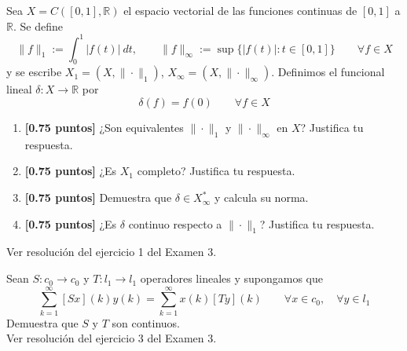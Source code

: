 \documentclass[12pt]{article}
\begin{document}
    \begin{ejercicio}[3 puntos]
        Sea $X = C([0,1],\mathbb{R})$ el espacio vectorial de las funciones continuas de $[0,1]$ a $\mathbb{R}$. Se define
        \begin{equation*}
            \|f\|_1 := \int_{0}^{1} |f(t)|~dt , \qquad \|f\|_\infty := \sup\{|f(t)| : t\in [0,1]\}\qquad \forall f\in X
        \end{equation*}
        y se escribe $X_1 = (X,\|\cdot \|_1)$, $X_{\infty} = (X,\|\cdot \|_\infty)$. Definimos el funcional lineal $\delta:X\to \mathbb{R}$ por
        \begin{equation*}
            \delta(f) = f(0) \qquad \forall f\in X
        \end{equation*}
        \begin{enumerate}[label=\alph*)]
            \item \textbf{[0.75 puntos]} ¿Son equivalentes $\|\cdot \|_1$ y $\|\cdot \|_\infty$ en $X$? Justifica tu respuesta.
            \item \textbf{[0.75 puntos]} ¿Es $X_1$ completo? Justifica tu respuesta.
            \item \textbf{[0.75 puntos]} Demuestra que $\delta\in X_\infty^\ast$ y calcula su norma.
            \item \textbf{[0.75 puntos]} ¿Es $\delta$ continuo respecto a $\|\cdot \|_1$? Justifica tu respuesta.
        \end{enumerate}


        Ver resolución del ejercicio 1 del Examen 3.
    \end{ejercicio}
    \newpage

    \begin{ejercicio}[3 puntos]
        Sean $S:c_0\to c_0$ y $T:l_1\to l_1$ operadores lineales y supongamos que
        \begin{equation*}
            \sum_{k=1}^{\infty}[Sx](k)y(k) = \sum_{k=1}^{\infty}x(k)[Ty](k) \qquad \forall x\in c_0, \quad \forall y\in l_1
        \end{equation*}
        Demuestra que $S$ y $T$ son continuos.\\

        Ver resolución del ejercicio 3 del Examen 3.
    \end{ejercicio}
\end{document}
